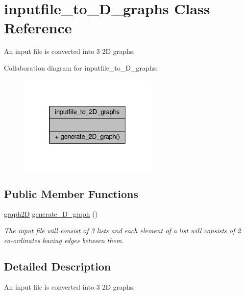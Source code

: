 \hypertarget{classinputfile__to__2D__graphs}{}\section{inputfile\+\_\+to\+\_\+D\+\_\+graphs Class Reference}
\label{classinputfile__to__2D__graphs}


An input file is converted into 3 2D graphs.  




Collaboration diagram for inputfile\+\_\+to\+\_\+D\+\_\+graphs\+:\nopagebreak
\begin{figure}[H]
\begin{center}
\leavevmode
\includegraphics[width=196pt]{classinputfile__to__2D__graphs__coll__graph}
\end{center}
\end{figure}
\subsection*{Public Member Functions}
\begin{DoxyCompactItemize}
\item 
\hyperlink{classgraph2D}{graph2D} \hyperlink{classinputfile__to__2D__graphs_a0ce33b1d22d63ec660201270d0314900}{generate\+\_\+D\+\_\+graph} ()
\begin{DoxyCompactList}\small\item\em The input file will consist of 3 lists and each element of a list will consists of 2 co-\/ordinates having edges between them. \end{DoxyCompactList}\end{DoxyCompactItemize}


\subsection{Detailed Description}
An input file is converted into 3 2D graphs. 

